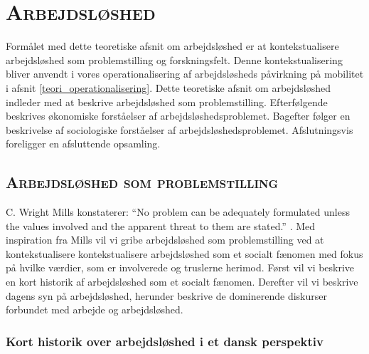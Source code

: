 

\newpage \section{\textsc{Arbejdsløshed \label{teori_arbejdsloeshed}}}

Formålet med dette teoretiske afsnit om arbejdsløshed er at kontekstualisere arbejdsløshed som problemstilling og forskningsfelt. Denne kontekstualisering bliver anvendt i vores operationalisering af arbejdsløsheds påvirkning på mobilitet i afsnit \ref{teori_operationalisering}. Dette teoretiske afsnit om arbejdsløshed indleder med at beskrive arbejdsløshed som problemstilling. Efterfølgende beskrives økonomiske forståelser af arbejdsløshedsproblemet. Bagefter følger en beskrivelse af sociologiske forståelser af arbejdsløshedsproblemet.  Afslutningsvis foreligger en afsluttende opsamling.








\subsection{\textsc{Arbejdsløshed som problemstilling}}

C. Wright Mills konstaterer: “No problem can be adequately formulated unless the values involved and the apparent threat to them are stated.” \textbf{\parencite[129]{Mills1959}}. Med inspiration fra Mills vil vi gribe arbejdsløshed som problemstilling ved at kontekstualisere kontekstualisere arbejdsløshed som et socialt fænomen med fokus på hvilke værdier, som er involverede og truslerne herimod. Først vil vi beskrive en kort historik af arbejdsløshed som et socialt fænomen. Derefter vil vi beskrive dagens syn på arbejdsløshed, herunder beskrive de dominerende diskurser forbundet med arbejde og arbejdsløshed. %


\subsubsection{Kort historik over arbejdsløshed i et dansk perspektiv}

